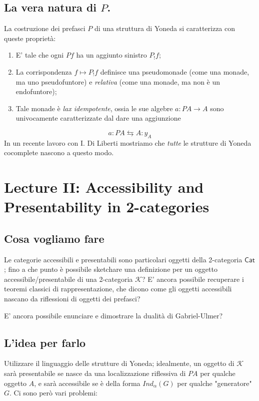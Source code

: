 \documentclass[11pt]{article}
\def\Cat{\mathsf{Cat}}
\theoremstyle{reference}
\begin{document}
\subsection{La vera natura di \(P\).}
\label{sec:orgda23700}

La costruzione dei prefasci \(P\) di una struttura di Yoneda si caratterizza con queste proprietà:

\begin{enumerate}
\item E' tale che ogni \(Pf\) ha un aggiunto sinistro \(P_!f\);
\item La corrispondenza \(f\mapsto P_!f\) definisce una pseudomonade (come una monade, ma uno pseudofuntore) e \emph{relativa} (come una monade, ma non è un endofuntore);
\item Tale monade è \emph{lax idempotente}, ossia le sue algebre \(a : PA\to A\) sono univocamente caratterizzate dal dare una aggiunzione
\end{enumerate}
\[
a : PA \leftrightarrows A : y_A
\]
In un recente lavoro con I. Di Liberti mostriamo che \emph{tutte} le strutture di Yoneda cocomplete nascono a questo modo.

\section{Lecture II: Accessibility and Presentability in 2-categories}
\label{sec:org8df2217}

\subsection{Cosa vogliamo fare}
\label{sec:org824d2fc}

Le categorie accessibili e presentabili sono particolari
oggetti della 2-categoria \(\Cat\); fino a che punto è
possibile sketchare una definizione per un oggetto
accessibile/presentabile di una 2-categoria \(\mathcal K\)? E'
ancora possibile recuperare i teoremi classici di
rappresentazione, che dicono come gli oggetti accessibili
nascano da riflessioni di oggetti dei prefasci?

E' ancora possibile enunciare e dimostrare la dualità di
Gabriel-Ulmer?

\subsection{L'idea per farlo}
\label{sec:org9fc038d}

Utilizzare il linguaggio delle strutture di Yoneda;
idealmente, un oggetto di \(\mathcal K\) sarà presentabile se
nasce da una localizzazione riflessiva di \(PA\) per qualche
oggetto \(A\), e sarà accessibile se è della forma
\(Ind_\alpha(G)\) per qualche "generatore" \(G\). Ci sono però
vari problemi:
\end{document}
